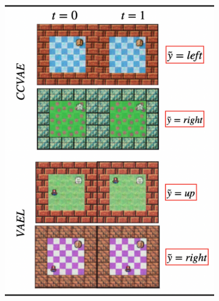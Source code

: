 \documentclass[10pt,xcolor={dvipsnames}]{beamer}
\begin{document}
\begin{frame}[t]
\begin{figure}[htb]
\begin{subfigure}[][0pt][t]{0.3\textwidth}
            \includegraphics[width=\textwidth]{figures/img-gen2.png}
        \end{subfigure}
    \end{figure}
\end{frame}
\end{document}
